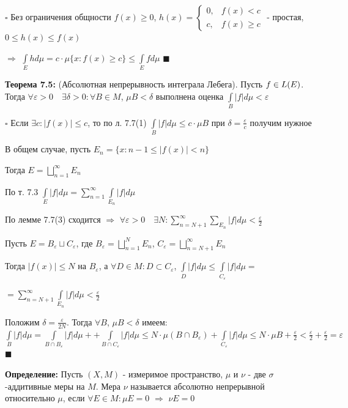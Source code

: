 \documentclass[a4paper]{report}
\newcommand*{\hm}[1]{#1\nobreak\discretionary{}%
            {\hbox{$\mathsurround=0pt #1$}}{}}
\begin{document}
\noindent $\square$ Без ограничения общности $f(x)\ge0$, $h(x)=\begin{cases}0,&f(x)<c\\c,&f(x)\ge c\end{cases}$ - простая, $0\le h(x)\le f(x)$

$\Rightarrow$ $\displaystyle\int\limits_E hd\mu=c\cdot\mu\{x\colon f(x)\ge c\}\le\displaystyle\int\limits_E fd\mu$ $\blacksquare$
\bigskip

\noindent\textbf{Теорема 7.5:} (Абсолютная непрерывность интеграла Лебега). Пусть $f\hm\in L(E)$. Тогда $\forall\varepsilon>0\quad\exists\delta>0\colon\forall B\in M$,
$\mu B<\delta$ выполнена оценка $\displaystyle\int\limits_B|f|d\mu<\varepsilon$

\noindent $\square$ Если $\exists c\colon|f(x)|\le c$, то по л. 7.7(1) $\displaystyle\int\limits_B|f|d\mu\le c\cdot\mu B$ при $\delta=\frac{\varepsilon}{c}$ получим нужное

В общем случае, пусть $E_n=\{x\colon n-1\le|f(x)|<n\}$

Тогда $E=\bigsqcup\limits_{n=1}^\infty E_n$

По т. 7.3 $\displaystyle\int\limits_E|f|d\mu=\sum\limits_{n=1}^\infty\displaystyle\int\limits_{E_n}|f|d\mu$

По лемме 7.7(3) сходится $\Rightarrow$ $\forall\varepsilon>0\quad\exists N\colon\sum\limits_{n=N+1}^\infty\sum\limits_{E_n}|f|d\mu<\frac\varepsilon2$

Пусть $E=B_\varepsilon\sqcup C_\varepsilon$, где $B_\varepsilon=\bigsqcup\limits_{n=1}^N E_n$, $C_\varepsilon=\bigsqcup\limits_{n=N+1}^\infty E_n$

Тогда $|f(x)|\le N$ на $B_\varepsilon$, а $\forall D\in M\colon D\subset C_\varepsilon$, $\displaystyle\int\limits_D|f|d\mu\le\displaystyle\int\limits_{C_\varepsilon}|f|d\mu=$

\noindent $=\sum\limits_{n=N+1}^\infty\displaystyle\int\limits_{E_n}|f|d\mu<\frac\varepsilon2$

Положим $\delta=\displaystyle\frac{\varepsilon}{2N}$. Тогда $\forall B$, $\mu B<\delta$ имеем: $\displaystyle\int\limits_B|f|d\mu=\displaystyle\int\limits_{B\cap B_\varepsilon}|f|d\mu++\displaystyle\int\limits_{B\cap
C_\varepsilon}|f|d\mu\le N\cdot\mu(B\cap B_\varepsilon)+\displaystyle\int\limits_{C_\varepsilon}|f|d\mu\le N\cdot\mu B+\frac\varepsilon2<\frac\varepsilon2+\frac\varepsilon2=\varepsilon$ $\blacksquare$
\bigskip

\noindent\textbf{Определение:} Пусть $(X,M)$ - измеримое пространство, $\mu$ и $\nu$ - две $\sigma$-аддитивные меры на $M$. Мера $\nu$ называется абсолютно непрерывной относительно $\mu$, если $\forall E\in M\colon\mu E=0$ $\Rightarrow$ $\nu E=0$
\bigskip
\end{document}
